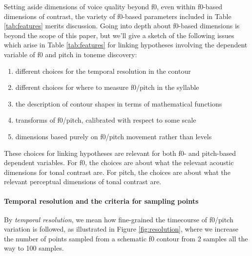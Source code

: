 \documentclass[12pt]{article}
\begin{document}
Setting aside dimensions of voice quality beyond f0, even within
f0-based dimensions of contrast, the variety of f0-based parameters
included in Table \ref{tab:features} merits discussion. Going into
depth about f0-based dimensions is beyond the scope of this paper, but
we'll give a sketch of the following issues which arise in Table
\ref{tab:features} for linking hypotheses involving the dependent variable of f0 and pitch in toneme discovery:

\begin{enumerate}
\item different choices for the temporal resolution in the contour
\item different choices for where to measure f0/pitch in the syllable
\item the description of contour shapes in terms of mathematical
  functions
\item transforms of f0/pitch, calibrated with respect to some scale
\item dimensions based purely on f0/pitch movement rather than levels
\end{enumerate}

These choices for linking hypotheses are relevant for both f0- and
pitch-based dependent variables. For f0, the choices are
about what the relevant acoustic dimensions for
tonal contrast are. For pitch, the choices are about what the relevant
perceptual dimensions of tonal contrast are.

\paragraph{Temporal resolution and the criteria for sampling points}

By \textit{temporal resolution}, we mean how fine-grained the
timecourse of f0/pitch variation is followed, as illustrated in Figure
\ref{fig:resolution}, where we increase the number of points sampled
from a schematic f0 contour from 2 samples all the way to 100
samples. 
\end{document}
